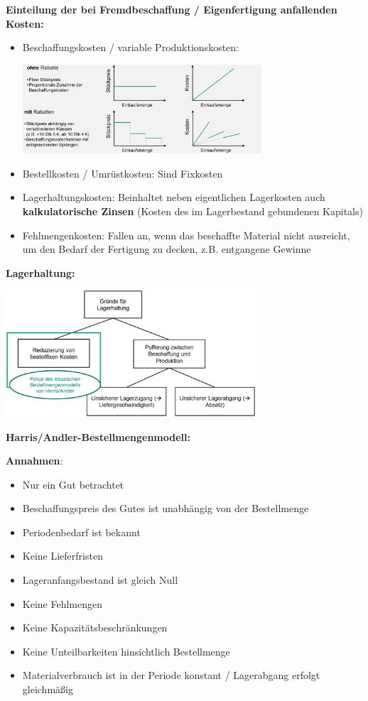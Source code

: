 \textbf{Einteilung der bei Fremdbeschaffung / Eigenfertigung anfallenden Kosten:}
\begin{itemize}
	\item Beschaffungskosten / variable Produktionskosten:
	\begin{center}
		\includegraphics[width=0.7\textwidth]{images/beschaffungskosten.png}
	\end{center}
	\item Bestellkosten / Umrüstkosten: Sind Fixkosten
	\item Lagerhaltungskosten: Beinhaltet neben eigentlichen Lagerkosten auch \textbf{kalkulatorische Zinsen} (Kosten des im Lagerbestand gebundenen Kapitals)
	\item Fehlmengenkosten: Fallen an, wenn das beschaffte Material nicht ausreicht, um den Bedarf der Fertigung zu decken, z.B. entgangene Gewinne
\end{itemize}

\textbf{Lagerhaltung:}
\begin{center}
	\includegraphics[width=0.7\textwidth]{images/lagerhaltung.png}
\end{center}

\textbf{Harris/Andler-Bestellmengenmodell:}

\textbf{Annahmen}:
\begin{itemize}
	\item Nur ein Gut betrachtet
	\item Beschaffungspreis des Gutes ist unabhängig von der Bestellmenge 
	\item Periodenbedarf ist bekannt
	\item Keine Lieferfristen
	\item Lageranfangsbestand ist gleich Null
	\item Keine Fehlmengen
	\item Keine Kapazitätsbeschränkungen
	\item Keine Unteilbarkeiten hinsichtlich Bestellmenge
	\item Materialverbrauch ist in der Periode konstant / Lagerabgang erfolgt gleichmäßig 
\end{itemize}

